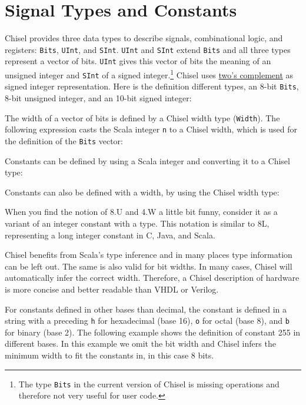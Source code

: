 \documentclass[%
    10pt, %
    headinclude, footexclude,
    openright, %
    notitlepage,
    cleardoubleempty,
    headsepline,
    pointlessnumbers,
    bibtotoc, idxtotoc,
    ]{scrbook}
\newcommand{\code}[1]{{\small{\texttt{#1}}}}
\newcommand{\codefoot}[1]{{\footnotesize{\texttt{#1}}}}
\newcommand{\myref}[2]{\href{#1}{#2}}
\begin{document}
\section{Signal Types and Constants}

Chisel provides three data types to describe signals, combinational logic, and registers:
\code{Bits}, \code{UInt}, and \code{SInt}. \code{UInt} and \code{SInt} extend \code{Bits}
and all three types represent a vector of bits. \code{UInt} gives this vector of
bits the meaning of an unsigned integer and \code{SInt} of a signed
integer.\footnote{The type \codefoot{Bits} in the current version of Chisel is missing operations and
therefore not very useful for user code.}
Chisel uses \myref{https://en.wikipedia.org/wiki/Two\%27s\_complement}{two's complement}
as signed integer representation.
Here is the definition different types, an 8-bit \code{Bits}, 8-bit unsigned integer, and an 10-bit
signed integer:



\noindent The width of a vector of bits is defined by a Chisel width type (\code{Width}).
The following expression casts the Scala integer \code{n} to a Chisel width,
which is used for the definition of the \code{Bits} vector:



\noindent Constants can be defined by using a Scala integer and converting it to a Chisel type:



\noindent Constants can also be defined with a width, by using the Chisel width type:



\noindent When you find the notion of 8.U and 4.W a little bit funny, consider it as a variant of an integer
constant with a type. This notation is similar to 8L, representing a long integer constant in C, Java, and Scala.

Chisel benefits from Scala's type inference and in many places type information can be left out.
The same is also valid for bit widths. In many cases, Chisel will automatically infer the correct width.
Therefore, a Chisel description of hardware is more concise and better readable than VHDL or
Verilog.

For constants defined in other bases than decimal, the constant is defined in a string with
a preceding \code{h} for hexadecimal (base 16), \code{o} for octal (base 8), and \code{b}
for binary (base 2). The following example shows the definition of constant 255 in different
bases. In this example we omit the bit width and Chisel infers the minimum width to fit
the constants in, in this case 8 bits.
\end{document}
